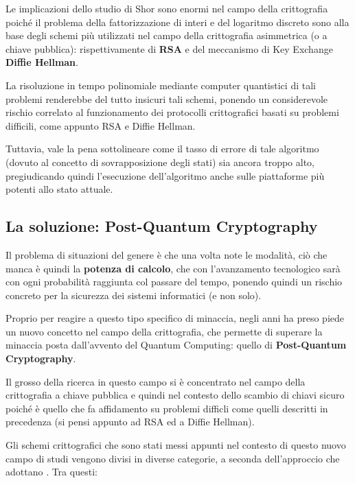 \documentclass[a4paper, 12pt, oneside]{article}
\theoremstyle{definition}
\begin{document}
Le implicazioni dello studio di Shor sono enormi nel campo della crittografia poiché il problema della fattorizzazione di interi e del logaritmo discreto sono alla base degli schemi più utilizzati nel campo della crittografia asimmetrica (o a chiave pubblica): rispettivamente di \textbf{RSA} e del meccanismo di Key Exchange \textbf{Diffie Hellman}.

La risoluzione in tempo polinomiale mediante computer quantistici di tali problemi renderebbe del tutto insicuri tali schemi, ponendo un considerevole rischio correlato al funzionamento dei protocolli crittografici basati su problemi difficili, come appunto RSA e Diffie Hellman.

Tuttavia, vale la pena sottolineare come il tasso di errore di tale algoritmo (dovuto al concetto di sovrapposizione degli stati) sia ancora troppo alto, pregiudicando quindi l'esecuzione dell'algoritmo anche sulle piattaforme più potenti allo stato attuale.

\newpage

\subsection{La soluzione: Post-Quantum Cryptography}
Il problema di situazioni del genere è che una volta note le modalità, ciò che manca è quindi la \textbf{potenza di calcolo}, che con l'avanzamento tecnologico sarà con ogni probabilità raggiunta col passare del tempo, ponendo quindi un rischio concreto per la sicurezza dei sistemi informatici (e non solo).

Proprio per reagire a questo tipo specifico di minaccia, negli anni ha preso piede un nuovo concetto nel campo della crittografia, che permette di superare la minaccia posta dall'avvento del Quantum Computing: quello di \textbf{Post-Quantum Cryptography}.

Il grosso della ricerca in questo campo si è concentrato nel campo della crittografia a chiave pubblica e quindi nel contesto dello scambio di chiavi sicuro poiché è quello che fa affidamento su problemi difficli come quelli descritti in precedenza (si pensi appunto ad RSA ed a Diffie Hellman).

Gli schemi crittografici che sono stati messi appunti nel contesto di questo nuovo campo di studi vengono divisi in diverse categorie, a seconda dell'approccio che adottano \cite{Bernstein2009}. Tra questi:
\end{document}
